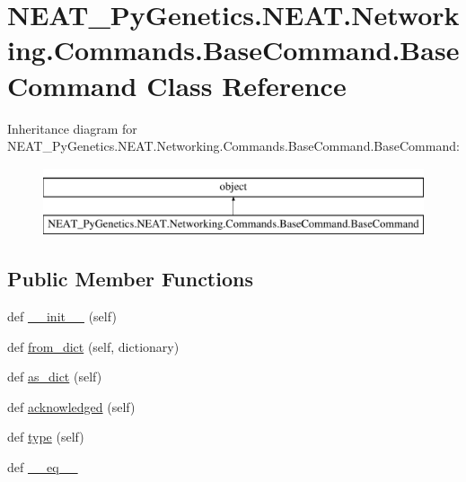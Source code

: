 \hypertarget{classNEAT__PyGenetics_1_1NEAT_1_1Networking_1_1Commands_1_1BaseCommand_1_1BaseCommand}{}\section{N\+E\+A\+T\+\_\+\+Py\+Genetics.\+N\+E\+A\+T.\+Networking.\+Commands.\+Base\+Command.\+Base\+Command Class Reference}
\label{classNEAT__PyGenetics_1_1NEAT_1_1Networking_1_1Commands_1_1BaseCommand_1_1BaseCommand}
Inheritance diagram for N\+E\+A\+T\+\_\+\+Py\+Genetics.\+N\+E\+A\+T.\+Networking.\+Commands.\+Base\+Command.\+Base\+Command\+:\begin{figure}[H]
\begin{center}
\leavevmode
\includegraphics[height=2.000000cm]{classNEAT__PyGenetics_1_1NEAT_1_1Networking_1_1Commands_1_1BaseCommand_1_1BaseCommand}
\end{center}
\end{figure}
\subsection*{Public Member Functions}
\begin{DoxyCompactItemize}
\item 
def \hyperlink{classNEAT__PyGenetics_1_1NEAT_1_1Networking_1_1Commands_1_1BaseCommand_1_1BaseCommand_a7f060792cc1f8ea526bc47c592eae10e}{\+\_\+\+\_\+init\+\_\+\+\_\+} (self)
\item 
def \hyperlink{classNEAT__PyGenetics_1_1NEAT_1_1Networking_1_1Commands_1_1BaseCommand_1_1BaseCommand_a7466f3e151d869df0c0680aeaabd5497}{from\+\_\+dict} (self, dictionary)
\item 
def \hyperlink{classNEAT__PyGenetics_1_1NEAT_1_1Networking_1_1Commands_1_1BaseCommand_1_1BaseCommand_af8833907610ee782bbf991be49efe73f}{as\+\_\+dict} (self)
\item 
def \hyperlink{classNEAT__PyGenetics_1_1NEAT_1_1Networking_1_1Commands_1_1BaseCommand_1_1BaseCommand_a255f188c1306814a7840d33dfcf7650c}{acknowledged} (self)
\item 
def \hyperlink{classNEAT__PyGenetics_1_1NEAT_1_1Networking_1_1Commands_1_1BaseCommand_1_1BaseCommand_a631800c4e60223cee2fed6930a7b47df}{type} (self)
\item 
def \hyperlink{classNEAT__PyGenetics_1_1NEAT_1_1Networking_1_1Commands_1_1BaseCommand_1_1BaseCommand_ae1b33bc9a9dad6bcb9f2d3bb28c7355f}{\+\_\+\+\_\+eq\+\_\+\+\_\+}
\end{DoxyCompactItemize}

